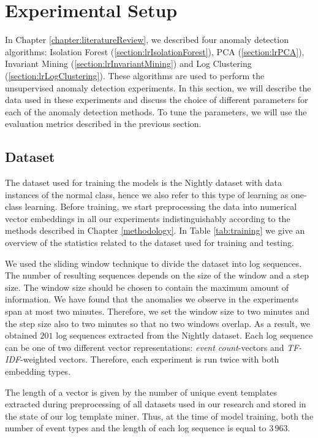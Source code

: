\section{Experimental Setup}
\label{section:experimental-setup}
In Chapter \ref{chapter:literatureReview}, we described four anomaly detection algorithms: Isolation Forest (\ref{section:lrIsolationForest}), PCA (\ref{section:lrPCA}), Invariant Mining (\ref{section:lrInvariantMining}) and Log Clustering (\ref{section:lrLogClustering}). These algorithms are used to perform the unsupervised anomaly detection experiments. In this section, we will describe the data used in these experiments and discuss the choice of different parameters for each of the anomaly detection methods. To tune the parameters, we will use the evaluation metrics described in the previous section.

\subsection{Dataset}
The dataset used for training the models is the Nightly dataset with data instances of the normal class, hence we also refer to this type of learning as one-class learning. Before training, we start preprocessing the data into numerical vector embeddings in all our experiments indistinguishably according to the methods described in Chapter \ref{methodology}. In Table \ref{tab:training} we give an overview of the statistics related to the dataset used for training and testing.

We used the sliding window technique to divide the dataset into log sequences. The number of resulting sequences depends on the size of the window and a step size. The window size should be chosen to contain the maximum amount of information. We have found that the anomalies we observe in the experiments span at most two minutes. Therefore, we set the window size to two minutes and the step size also to two minutes so that no two windows overlap. As a result, we obtained $201$ log sequences extracted from the Nightly dataset. Each log sequence can be one of two different vector representations: \textit{event count}-vectors and \textit{TF-IDF}-weighted vectors. Therefore, each experiment is run twice with both embedding types.

The length of a vector is given by the number of unique event templates extracted during preprocessing of all datasets used in our research and stored in the state of our log template miner. Thus, at the time of model training, both the number of event types and the length of each log sequence is equal to $3\,963$.

